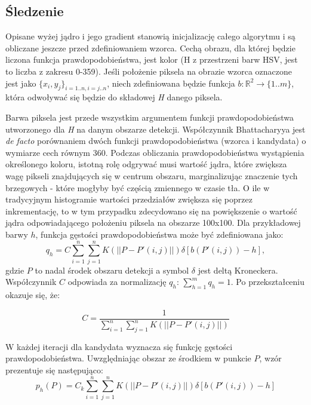 \subsection{Śledzenie}
Opisane wyżej jądro i jego gradient stanowią inicjalizację całego algorytmu i są obliczane jeszcze przed zdefiniowaniem wzorca. Cechą obrazu, dla której będzie liczona funkcja prawdopodobieństwa, jest kolor (H z przestrzeni barw HSV, jest to liczba z zakresu 0-359). 
Jeśli położenie piksela na obrazie wzorca oznaczone jest jako $\{x_{i},y_{j}\}_{i=1..n,i=j..n}$, niech zdefiniowana będzie funkcja $b:\mathbb{R}^2\rightarrow\{1..m\}$, która odwoływać się będzie do składowej \textit{H} danego piksela.

Barwa piksela jest przede wszystkim argumentem funkcji prawdopodobieństwa utworzonego dla \textit{H} na danym obszarze detekcji. Współczynnik Bhattacharyya jest \textit{de facto} porównaniem dwóch funkcji prawdopodobieństwa (wzorca i kandydata) o wymiarze cech równym 360.   
Podczas obliczania prawdopodobieństwa wystąpienia określonego koloru, istotną rolę odgrywać musi wartość jądra, które zwiększa wagę pikseli znajdujących się w centrum obszaru, marginalizując znaczenie tych brzegowych - które mogłyby być częścią zmiennego w czasie tła. O ile w tradycyjnym histogramie wartości przedziałów zwiększa się poprzez inkrementację, to w tym przypadku zdecydowano się na powiększenie o wartość jądra odpowiadającego położeniu piksela na obszarze 100x100.
 Dla przykładowej barwy $h$, funkcja gęstości prawdopodobieństwa może być zdefiniowana jako:
\begin{equation}
q_h=C\sum_{i=1}^{n}\sum_{j=1}^{n}K(||P-P'(i,j)||)\delta[b(P'(i,j))-h],
\end{equation}
gdzie $P$ to nadal środek obszaru detekcji a symbol $\delta$ jest deltą Kroneckera. Współczynnik $C$ odpowiada za normalizację $q_h$: $\sum_{h=1}^{m}q_h=1$.
Po przekształceniu okazuje się, że:

\begin{equation}
C=\frac{1}{\sum_{i=1}^{n}\sum_{j=1}^{n}K(||P-P'(i,j)||)} 
\end{equation}

W każdej iteracji dla kandydata wyznacza się funkcję gęstości prawdopodobieństwa. Uwzględniając obszar ze środkiem w punkcie $P$, wzór prezentuje się następująco:
\begin{equation}
\label{eq:density}
p_h(P)=C_k\sum_{i=1}^{n}\sum_{j=1}^{n}K(||P-P'(i,j)||)\delta[b(P'(i,j))-h] 
\end{equation}

